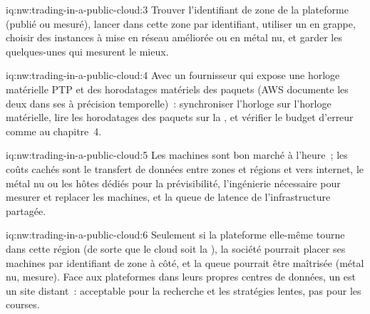 \begin{solution}{iq:nw:trading-in-a-public-cloud:3}
Trouver l'identifiant de zone de la plateforme (publié ou mesuré), lancer dans cette zone par identifiant, utiliser un  en grappe, choisir des instances à
mise en réseau améliorée ou en métal nu, et garder les quelques-unes qui mesurent le mieux.
\end{solution}

\begin{solution}{iq:nw:trading-in-a-public-cloud:4}
Avec un fournisseur qui expose une horloge matérielle PTP et des horodatages matériels des paquets (AWS documente les deux dans ses  à précision temporelle)~:
synchroniser l'horloge sur l'horloge matérielle, lire les horodatages des paquets sur la , et vérifier le budget d'erreur comme au chapitre~4.
\end{solution}

\begin{solution}{iq:nw:trading-in-a-public-cloud:5}
Les machines sont bon marché à l'heure~; les coûts cachés sont le transfert de données entre zones et régions et vers internet, le métal nu ou les hôtes dédiés
pour la prévisibilité, l'ingénierie nécessaire pour mesurer et replacer les machines, et la queue de latence de l'infrastructure partagée.
\end{solution}

\begin{solution}{iq:nw:trading-in-a-public-cloud:6}
Seulement si la plateforme elle-même tourne dans cette région (de sorte que le cloud soit la ), la société pourrait placer ses machines par identifiant de zone à côté, et la queue
pourrait être maîtrisée (métal nu, mesure). Face aux plateformes dans leurs propres centres de données, un  est un site distant~: acceptable pour la recherche et
les stratégies lentes, pas pour les courses.
\end{solution}
